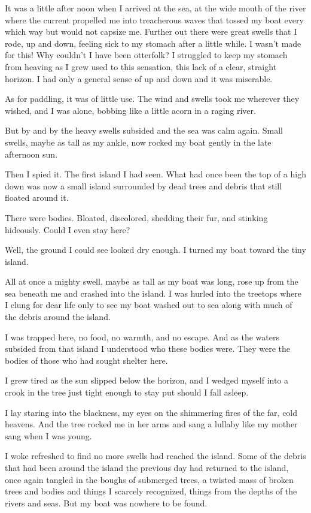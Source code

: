 It was a little after noon when I arrived at the sea, at the wide mouth of the river where the current propelled me into treacherous waves that tossed my boat every which way but would not capsize me. Further out there were great swells that I rode, up and down, feeling sick to my stomach after a little while. I wasn't made for this! Why couldn't I have been otterfolk? I struggled to keep my stomach from heaving as I grew used to this sensation, this lack of a clear, straight horizon. I had only a general sense of up and down and it was miserable.

As for paddling, it was of little use. The wind and swells took me wherever they wished, and I was alone, bobbing like a little acorn in a raging river.

But by and by the heavy swells subsided and the sea was calm again. Small swells, maybe as tall as my ankle, now rocked my boat gently in the late afternoon sun.

Then I spied it. The first island I had seen. What had once been the top of a high down was now a small island surrounded by dead trees and debris that still floated around it.

There were bodies. Bloated, discolored, shedding their fur, and stinking hideously. Could I even stay here?

Well, the ground I could see looked dry enough. I turned my boat toward the tiny island.

All at once a mighty swell, maybe as tall as my boat was long, rose up from the sea beneath me and crashed into the island. I was hurled into the treetops where I clung for dear life only to see my boat washed out to sea along with much of the debris around the island.

I was trapped here, no food, no warmth, and no escape. And as the waters subsided from that island I understood who these bodies were. They were the bodies of those who had sought shelter here.

I grew tired as the sun slipped below the horizon, and I wedged myself into a crook in the tree just tight enough to stay put should I fall asleep.

I lay staring into the blackness, my eyes on the shimmering fires of the far, cold heavens. And the tree rocked me in her arms and sang a lullaby like my mother sang when I was young.

I woke refreshed to find no more swells had reached the island. Some of the debris that had been around the island the previous day had returned to the island, once again tangled in the boughs of submerged trees, a twisted mass of broken trees and bodies and things I scarcely recognized, things from the depths of the rivers and seas. But my boat was nowhere to be found.

